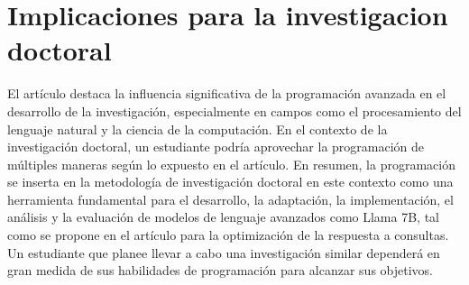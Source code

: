 \documentclass[12pt,twocolumn]{article}
\begin{document}

\section{Implicaciones para la investigacion doctoral}
El artículo destaca la influencia significativa de la programación avanzada en el desarrollo de la investigación, especialmente en campos como el procesamiento del lenguaje natural y la ciencia de la computación.
En el contexto de la investigación doctoral, un estudiante podría aprovechar la programación de múltiples maneras según lo expuesto en el artículo.
En resumen, la programación se inserta en la metodología de investigación doctoral en este contexto como una herramienta fundamental para el desarrollo, la adaptación, la implementación, el análisis y la evaluación de modelos de lenguaje avanzados como Llama 7B, tal como se propone en el artículo para la optimización de la respuesta a consultas. 
Un estudiante que planee llevar a cabo una investigación similar dependerá en gran medida de sus habilidades de programación para alcanzar sus objetivos.
\end{document}
